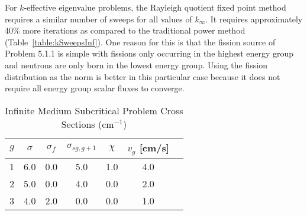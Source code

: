 For $k$-effective eigenvalue problems, the Rayleigh quotient fixed point method requires a similar number of sweeps for all values of $k_{\infty}$. It requires approximately 40\% more iterations as compared to the traditional power method (Table~\ref{table:kSweepsInf}). One reason for this is that the fission source of Problem 5.1.1 is simple with fissions only occurring in the highest energy group and neutrons are only born in the lowest energy group. Using the fission distribution as the norm is better in this particular case because it does not require all energy group scalar fluxes to converge.

\begin{table}[!htbp]
    \centering
    \caption{Infinite Medium Subcritical Problem Cross Sections (cm$^{-1}$)}
\label{table:Betzler3}
    \begin{tabular}{*7c}
        \toprule
	$g$ & $\sigma$ & $\sigma_{f}$ & $\sigma_{sg,g+1}$ & $\chi$ & $v_{g}$ [cm/s] \\ 
        \midrule
	1 & 6.0 & 0.0 & 5.0 & 1.0 & 4.0 \\
	2 & 5.0 & 0.0 & 4.0 & 0.0 & 2.0 \\
	3 & 4.0 & 2.0 & 0.0 & 0.0 & 1.0 \\
        \bottomrule
    \end{tabular}
\end{table}

